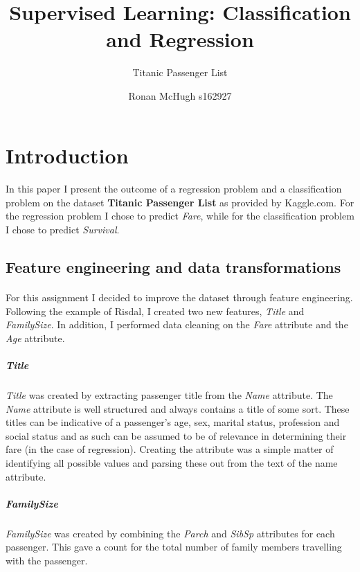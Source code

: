 \documentclass[a4paper]{scrartcl}
\begin{document}
\title{Supervised Learning: Classification and Regression}
\subtitle{Titanic Passenger List}
\author{Ronan McHugh s162927}

\maketitle

\section{Introduction}
\paragraph{}
In this paper I present the outcome of a regression problem and a classification problem on the dataset \textbf{Titanic Passenger List} as provided by Kaggle.com\cite{kaggle16}. For the regression problem I chose to predict \emph{Fare}, while for the classification problem I chose to predict \emph{Survival}.
\subsection{Feature engineering and data transformations}
\paragraph{}
For this assignment I decided to improve the dataset through feature engineering. 
Following the example of Risdal\cite{risdal16}, I created two new features, \emph{Title} and \emph{FamilySize}. In addition, I performed data cleaning on the \emph{Fare} attribute and the \emph{Age} attribute.

\subparagraph{Title} 
\emph{Title} was created by extracting passenger title from the \emph{Name} attribute. The \emph{Name} attribute is well structured and always contains a title of some sort. These titles can be indicative of a passenger's age, sex, marital status, profession and social status and as such can be assumed to be of relevance in determining their fare (in the case of regression).
Creating the attribute was a simple matter of identifying all possible values and parsing these out from the text of the name attribute. 

\subparagraph{FamilySize} \emph{FamilySize} was created  by combining the \emph{Parch} and \emph{SibSp} attributes for each passenger. This gave a count for the total number of family members travelling with the passenger.
\end{document}
